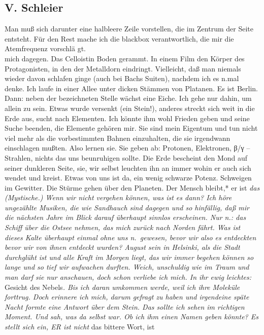 \documentclass[
]{article}
\author{}
\date{\vspace{-2.5em}}
\begin{document}
\subsection{V. Schleier}\label{v.-schleier}

Man muß sich darunter eine halbleere Zeile vorstellen, die im Zentrum
der Seite entsteht. Für den Rest mache ich die blackbox verantwortlich,
die mir die Atemfrequenz vorschlä gt.\\
mich dagegen. Das Celloistin Boden gerammt. In einem Film den Körper des
Protagonisten, in den der Metalldorn eindringt. Vielleicht, daß man
niemals wieder davon schlafen ginge (auch bei Bachs Suiten), nachdem ich
es n.mal denke. Ich laufe in einer Allee unter dicken Stämmen von
Platanen. Es ist Berlin. Dann: neben der bezeichneten Stelle wächst eine
Eiche. Ich gehe nur dahin, um allein zu sein. Etwas wurde versenkt (ein
Stein!), anderes streckt sich weit in die Erde aus, sucht nach
Elementen. Ich könnte ihm wohl Frieden geben und seine Suche beenden,
die Elemente gehören mir. Sie sind mein Eigentum und tun nicht viel mehr
als die vorbestimmten Bahnen einzuhalten, die sie irgendwann einschlagen
mußten. Also lernen sie. Sie geben ab: Protonen, Elektronen, β/γ --
Strahlen, nichts das uns beunruhigen sollte. Die Erde bescheint den Mond
auf seiner dunkleren Seite, sie, wir selbst leuchten ihn an immer wohin
er auch sich wendet und kreist. Etwas von uns ist da, ein wenig schwarze
Potenz. Schweigen im Gewitter. Die Stürme gehen über den Planeten. Der
Mensch bleibt,* er ist \emph{das\\
(Mystische.) Wenn wir nicht vergehen können, was ist es dann? Ich höre
ungezählte Musiken, die wie Sandhauch sind dagegen und so hinfällig, daß
mir die nächsten Jahre im Blick darauf überhaupt sinnlos erscheinen. Nur
n.: das Schiff über die Ostsee nehmen, das mich zurück nach Norden
fährt. Was ist dieses Kalte überhaupt einmal ohne uns n.~gewesen, bevor
wir also es entdeckten bevor wir von ihnen entdeckt wurden? August sein
in Helsinki, als die Stadt durchglüht ist und alle Kraft im Morgen
liegt, das wir immer begehen können so lange und so tief wir aufwachen
durften. Weich, unschuldig wie im Traum und man darf sie nur anschauen,
doch schon verliebe ich mich. In ihr ewig leichtes: }Gesicht des
Nebels\emph{. Bis ich daran umkommen werde, weil ich ihre Moleküle
forttrug. Doch erinnere ich mich, darum gefragt zu haben und irgendeine
späte Nacht formte eine Antwort über dem Stein. Das sollte ich sehen im
richtigen Moment. Und sah, was da selbst war. Ob ich ihm einen Namen
geben könnte? Es stellt sich ein, ER ist nicht }das bittere Wort, ist
\end{document}
